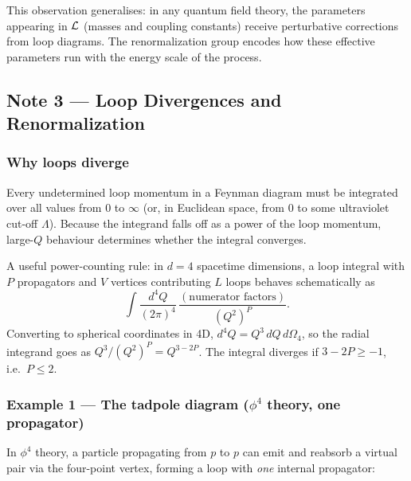 \documentclass[../main.tex]{subfiles}
\begin{document}
This observation generalises: in any quantum field theory, the parameters appearing in $\mathcal{L}$ (masses and coupling constants) receive perturbative corrections from loop diagrams. The renormalization group encodes how these effective parameters run with the energy scale of the process.

\subsection*{Note 3 — Loop Divergences and Renormalization}

\subsubsection*{Why loops diverge}

Every undetermined loop momentum in a Feynman diagram must be integrated over all values from $0$ to $\infty$ (or, in Euclidean space, from $0$ to some ultraviolet cut-off $\Lambda$).  Because the integrand falls off as a power of the loop momentum, large-$Q$ behaviour determines whether the integral converges.

A useful power-counting rule: in $d = 4$ spacetime dimensions, a loop integral with $P$ propagators and $V$ vertices contributing $L$ loops behaves schematically as
\begin{equation}
  \int \frac{d^4Q}{(2\pi)^4}\, \frac{(\text{numerator factors})}{(Q^2)^P}.
  \label{eq:lec06:loop-counting}
\end{equation}
Converting to spherical coordinates in 4D, $d^4Q = Q^3\,dQ\,d\Omega_4$, so the radial integrand goes as $Q^3/(Q^2)^P = Q^{3-2P}$.  The integral diverges if $3 - 2P \geq -1$, i.e.\ $P \leq 2$.

\subsubsection*{Example 1 — The tadpole diagram ($\phi^4$ theory, one propagator)}

In $\phi^4$ theory, a particle propagating from $p$ to $p$ can emit and reabsorb a virtual pair via the four-point vertex, forming a loop with \emph{one} internal propagator:

\begin{center}
\end{center}
\end{document}

